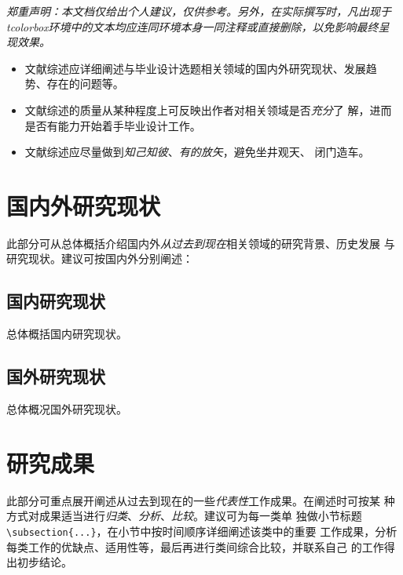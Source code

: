\begin{tcolorbox}
	\emph{郑重声明：本文档仅给出个人建议，仅供参考。另外，在实际撰写时，凡出现于
		tcolorbox环境中的文本均应连同环境本身一同注释或直接删除，以免影响最终呈
		现效果。}
\end{tcolorbox}

\begin{tcolorbox}
	\begin{itemize}
		\item 文献综述应详细阐述与毕业设计选题相关领域的国内外研究现状、发展趋
		      势、存在的问题等。
		\item 文献综述的质量从某种程度上可反映出作者对相关领域是否\emph{充分}了
		      解，进而是否有能力开始着手毕业设计工作。
		\item 文献综述应尽量做到\emph{知己知彼}、\emph{有的放矢}，避免坐井观天、
		      闭门造车。
	\end{itemize}
\end{tcolorbox}

\section{国内外研究现状}

\begin{tcolorbox}
	此部分可从总体概括介绍国内外\emph{从过去到现在}相关领域的研究背景、历史发展
	与研究现状。建议可按国内外分别阐述：
\end{tcolorbox}

\subsection{国内研究现状}

\begin{tcolorbox}
	总体概括国内研究现状。
\end{tcolorbox}

\subsection{国外研究现状}

\begin{tcolorbox}
	总体概况国外研究现状。
\end{tcolorbox}

\section{研究成果}

\begin{tcolorbox}
	此部分可重点展开阐述从过去到现在的一些\emph{代表性}工作成果。在阐述时可按某
	种方式对成果适当进行\emph{归类}、\emph{分析}、\emph{比较}。建议可为每一类单
	独做小节标题\verb|\subsection{...}|，在小节中按时间顺序详细阐述该类中的重要
	工作成果，分析每类工作的优缺点、适用性等，最后再进行类间综合比较，并联系自己
	的工作得出初步结论。
\end{tcolorbox}

